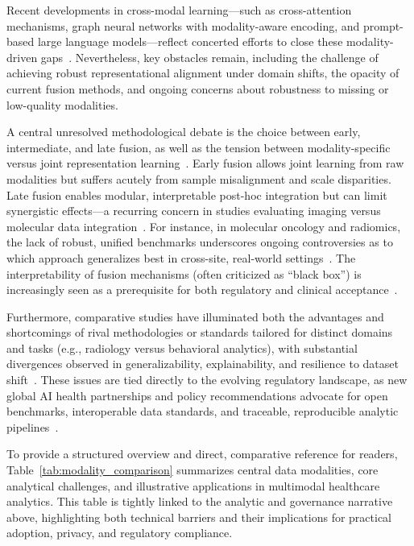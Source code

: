 \documentclass[sigconf]{acmart}
\begin{document}
Recent developments in cross-modal learning---such as cross-attention mechanisms, graph neural networks with modality-aware encoding, and prompt-based large language models---reflect concerted efforts to close these modality-driven gaps~\cite{ref16,ref17,ref18,ref67,ref68,ref70,ref107}. Nevertheless, key obstacles remain, including the challenge of achieving robust representational alignment under domain shifts, the opacity of current fusion methods, and ongoing concerns about robustness to missing or low-quality modalities. 

\vspace{1ex}
A central unresolved methodological debate is the choice between early, intermediate, and late fusion, as well as the tension between modality-specific versus joint representation learning~\cite{ref28,ref30,ref70}. Early fusion allows joint learning from raw modalities but suffers acutely from sample misalignment and scale disparities. Late fusion enables modular, interpretable post-hoc integration but can limit synergistic effects---a recurring concern in studies evaluating imaging versus molecular data integration~\cite{ref54,ref67,ref83,ref90}. For instance, in molecular oncology and radiomics, the lack of robust, unified benchmarks underscores ongoing controversies as to which approach generalizes best in cross-site, real-world settings~\cite{ref46,ref54,ref67}. The interpretability of fusion mechanisms (often criticized as ``black box'') is increasingly seen as a prerequisite for both regulatory and clinical acceptance~\cite{ref30,ref70}.

Furthermore, comparative studies have illuminated both the advantages and shortcomings of rival methodologies or standards tailored for distinct domains and tasks (e.g., radiology versus behavioral analytics), with substantial divergences observed in generalizability, explainability, and resilience to dataset shift~\cite{ref54,ref67,ref83,ref90}. These issues are tied directly to the evolving regulatory landscape, as new global AI health partnerships and policy recommendations advocate for open benchmarks, interoperable data standards, and traceable, reproducible analytic pipelines~\cite{ref82,ref84,ref70}.

\vspace{1ex}
To provide a structured overview and direct, comparative reference for readers, Table~\ref{tab:modality_comparison} summarizes central data modalities, core analytical challenges, and illustrative applications in multimodal healthcare analytics. This table is tightly linked to the analytic and governance narrative above, highlighting both technical barriers and their implications for practical adoption, privacy, and regulatory compliance.
\end{document}
